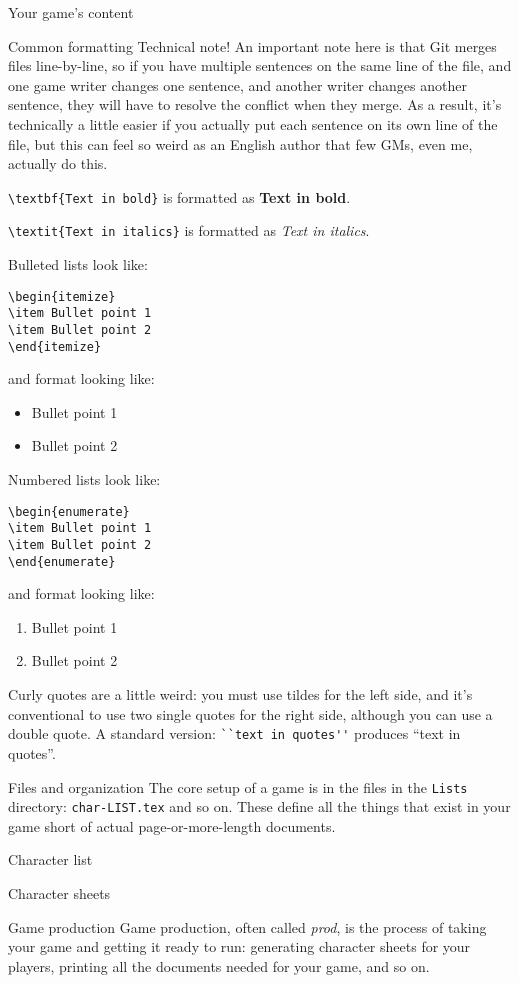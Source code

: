 \documentclass{article}
\begin{document}
\begin{section}{Your game's content}
\begin{subsection}{Common formatting}
Technical note! An important note here is that Git merges files line-by-line, so if you have multiple sentences on the same line of the file, and one game writer changes one sentence, and another writer changes another sentence, they will have to resolve the conflict when they merge.  As a result, it's technically a little easier if you actually put each sentence on its own line of the file, but this can feel so weird as an English author that few GMs, even me, actually do this.

\lstinline|\textbf{Text in bold}| is formatted as \textbf{Text in bold}.

\lstinline|\textit{Text in italics}| is formatted as \textit{Text in italics}.

Bulleted lists look like:
\begin{verbatim}
\begin{itemize}
\item Bullet point 1
\item Bullet point 2
\end{itemize}
\end{verbatim}
and format looking like:
\begin{itemize}
\item Bullet point 1
\item Bullet point 2
\end{itemize}

Numbered lists look like:
\begin{verbatim}
\begin{enumerate}
\item Bullet point 1
\item Bullet point 2
\end{enumerate}
\end{verbatim}
and format looking like:
\begin{enumerate}
\item Bullet point 1
\item Bullet point 2
\end{enumerate}

Curly quotes are a little weird: you must use tildes for the left side, and it's conventional to use two single quotes for the right side, although you can use a double quote.  A standard version: \lstinline{``text in quotes''} produces ``text in quotes''.

\end{subsection}
\begin{subsection}{Files and organization}
The core setup of a game is in the files in the \lstinline{Lists} directory: \lstinline{char-LIST.tex} and so on.  These define all the things that exist in your game short of actual page-or-more-length documents.
\begin{subsubsection}{Character list}
\end{subsubsection}
\end{subsection}
\begin{subsection}{Character sheets}
\end{subsection}
\end{section}
\begin{section}{Game production}
Game production, often called \emph{prod}, is the process of taking your game and getting it ready to run: generating character sheets for your players, printing all the documents needed for your game, and so on.
\end{section}
\end{document}
